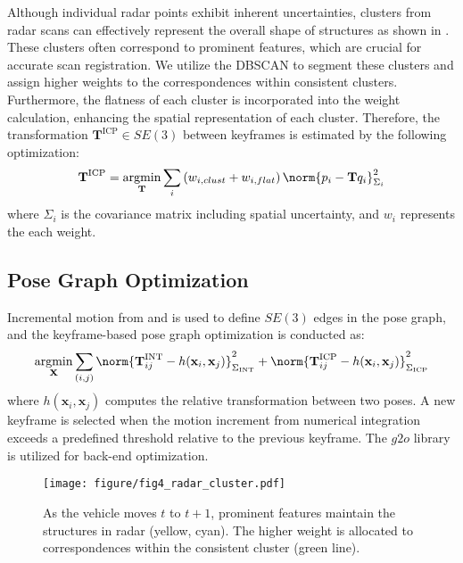 Although individual radar points exhibit inherent uncertainties, clusters from radar scans can effectively represent the overall shape of structures as shown in . These clusters often correspond to prominent features, which are crucial for accurate scan registration. We utilize the DBSCAN to segment these clusters and assign higher weights to the correspondences within consistent clusters. Furthermore, the flatness of each cluster is incorporated into the weight calculation, enhancing the spatial representation of each cluster.
Therefore, the transformation $\textbf{T}^{\text{ICP}}\in SE(3)$ between keyframes is estimated by the following optimization:
\begin{equation}
    \displaystyle \textbf{T}^{\text{ICP}}=\argmin_{\textbf{T}} \sum_i \left(w_{i, clust}+w_{i,flat}\right)\norm{p_i-\textbf{T}q_i}_{\Sigma_i}^2
\end{equation}
where $\Sigma_i$ is the covariance matrix including spatial uncertainty, and $w_i$ represents the each weight.


\subsection{Pose Graph Optimization}

Incremental motion from  and  is used to define $SE(3)$ edges in the pose graph, and the keyframe-based pose graph optimization is conducted as:
\vspace{-1mm}
\begin{eqnarray}
\label{eqn:pgo}
    \argmin_{\textbf{X}}\sum_{(i,j)}\norm{\textbf{T}^{\text{INT}}_{ij}-h(\textbf{x}_i,\textbf{x}_j)}^2_{\Sigma_\text{INT}}+\norm{\textbf{T}^{\text{ICP}}_{ij}-h(\textbf{x}_i,\textbf{x}_j)}^2_{\Sigma_\text{ICP}}
\end{eqnarray}
where $h(\textbf{x}_i,\textbf{x}_j)$ computes the relative transformation between two poses. 
A new keyframe is selected when the motion increment from numerical integration exceeds a predefined threshold relative to the previous keyframe. The $g2o$ \cite{kummerle2011g} library is utilized for back-end optimization.


\begin{figure}[!t]
    \centering
    \texttt{[image: figure/fig4\_radar\_cluster.pdf]}
    \vspace{-7mm}
    \caption{
        As the vehicle moves $t$ to $t+1$, prominent features maintain the structures in radar (yellow, cyan). The higher weight is allocated to correspondences within the consistent cluster (green line).
    }
    \label{fig:cluster}
    \vspace{-6mm}
\end{figure}
